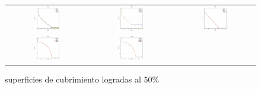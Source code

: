 \begin{figure}[h]
\centering
\caption{superficies de cubrimiento logradas al 50\%}%
\begin{tabular}{ccc}
  \includegraphics[width=0.33\textwidth]{Figures_Chapter7/Results_Chapter3/WFG1.eps} &
  \includegraphics[width=0.33\textwidth]{Figures_Chapter7/Results_Chapter3/WFG2.eps} &
  \includegraphics[width=0.33\textwidth]{Figures_Chapter7/Results_Chapter3/WFG3.eps} 
\\
  \includegraphics[width=0.33\textwidth]{Figures_Chapter7/Results_Chapter3/WFG4.eps} &
  \includegraphics[width=0.33\textwidth]{Figures_Chapter7/Results_Chapter3/WFG5.eps} &

\end{tabular}
\end{figure}
